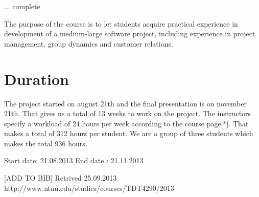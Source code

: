 ... complete

The purpose of the course is to let students acquire practical experience in development of a medium-large software project,
including experience in project management, group dynamics and customer relations.

\section{Duration}
\label{section:duration}
The project started on august 21th and the final presentation is on november 21th. That gives us a total of 13 weeks to work on the project. The instructors specify a workload of 24 hours per week according to the course page[*]. That makes a total of 312 hours per student. We are a group of three students which makes the total 936 hours.

Start date: 21.08.2013
End date : 21.11.2013

[ADD TO BIB] Retrived 25.09.2013 http://www.ntnu.edu/studies/courses/TDT4290/2013

